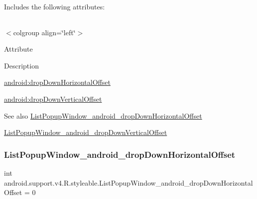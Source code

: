 Includes the following attributes\+:

\tabulinesep=1mm
\begin{longtabu} spread 0pt [c]{*{0}{|X[-1]}|}
\hline
\end{longtabu}
$<$colgroup align=\char`\"{}left\char`\"{}$>$ 

Attribute

Description 

{\ttfamily \hyperlink{classandroid_1_1support_1_1v4_1_1R_1_1styleable_a3bbedcbea2481b0e13e1e96a900a4e4b}{android\+:drop\+Down\+Horizontal\+Offset}}

{\ttfamily \hyperlink{classandroid_1_1support_1_1v4_1_1R_1_1styleable_a54cc42e9f9c914a25d69d42af01dc638}{android\+:drop\+Down\+Vertical\+Offset}}

\begin{DoxySeeAlso}{See also}
\hyperlink{classandroid_1_1support_1_1v4_1_1R_1_1styleable_a3bbedcbea2481b0e13e1e96a900a4e4b}{List\+Popup\+Window\+\_\+android\+\_\+drop\+Down\+Horizontal\+Offset} 

\hyperlink{classandroid_1_1support_1_1v4_1_1R_1_1styleable_a54cc42e9f9c914a25d69d42af01dc638}{List\+Popup\+Window\+\_\+android\+\_\+drop\+Down\+Vertical\+Offset} 
\end{DoxySeeAlso}
\mbox{\label{classandroid_1_1support_1_1v4_1_1R_1_1styleable_a3bbedcbea2481b0e13e1e96a900a4e4b}} 
\subsubsection{\texorpdfstring{List\+Popup\+Window\+\_\+android\+\_\+drop\+Down\+Horizontal\+Offset}{ListPopupWindow\_android\_dropDownHorizontalOffset}}
{\footnotesize\ttfamily int android.\+support.\+v4.\+R.\+styleable.\+List\+Popup\+Window\+\_\+android\+\_\+drop\+Down\+Horizontal\+Offset = 0\hspace{0.3cm}{\ttfamily [static]}}

